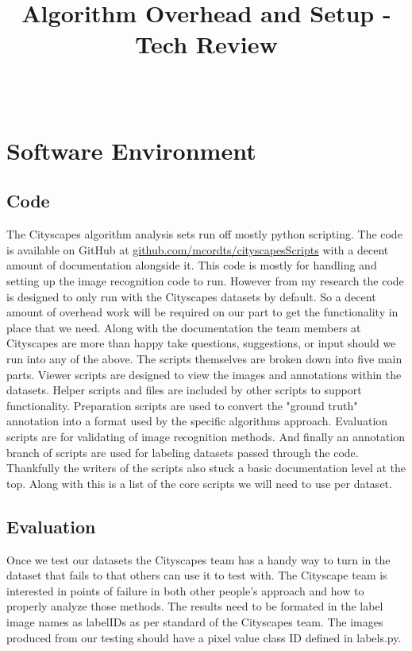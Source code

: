 \documentclass[10pt,draftclsnofoot,onecolumn,journal,compsoc]{IEEEtran}
\title{Algorithm Overhead and Setup - Tech Review}
\author{
	\IEEEauthorblockN{Team (Group 32) name: Teaching AutoPilot to Dodge\\ Tanner Fry} \\
	\IEEEauthorblockA{CS 461: Senior Capstone Fall 2016 \\ Oregon State University}
}
\date{}
\begin{document}
	
	\maketitle
	\IEEEdisplaynontitleabstractindextext
	\IEEEpeerreviewmaketitle
	
	\newpage
	
	\tableofcontents
	
	\newpage
	
	\section{Software Environment}
	\subsection{Code}
	The Cityscapes algorithm analysis sets run off mostly python scripting. The code is available on GitHub at \url{github.com/mcordts/cityscapesScripts} with a decent amount of documentation alongside it. This code is mostly for handling and setting up the image recognition code to run. However from my research the code is designed to only run with the Cityscapes datasets by default. So a decent amount of overhead work will be required on our part to get the functionality in place that we need. Along with the documentation the team members at Cityscapes are more than happy take questions, suggestions, or input should we run into any of the above.
	The scripts themselves are broken down into five main parts. Viewer scripts are designed to view the images and annotations within the datasets. Helper scripts and files are included by other scripts to support functionality. Preparation scripts are used to convert the "ground truth" annotation into a format used by the specific algorithms approach. Evaluation scripts are for validating of image recognition methods. And finally an annotation branch of scripts are used for labeling datasets passed through the code.
	Thankfully the writers of the scripts also stuck a basic documentation level at the top. Along with this is a list of the core scripts we will need to use per dataset.
	\subsection{Evaluation}
	Once we test our datasets the Cityscapes team has a handy way to turn in the dataset that fails to that others can use it to test with. The Cityscape team is interested in points of failure in both other people's approach and how to properly analyze those methods. The results need to be formated in the label image names as labelIDs as per standard of the Cityscapes team. The images produced from our testing should have a pixel value class ID defined in labels.py. 
\end{document}
